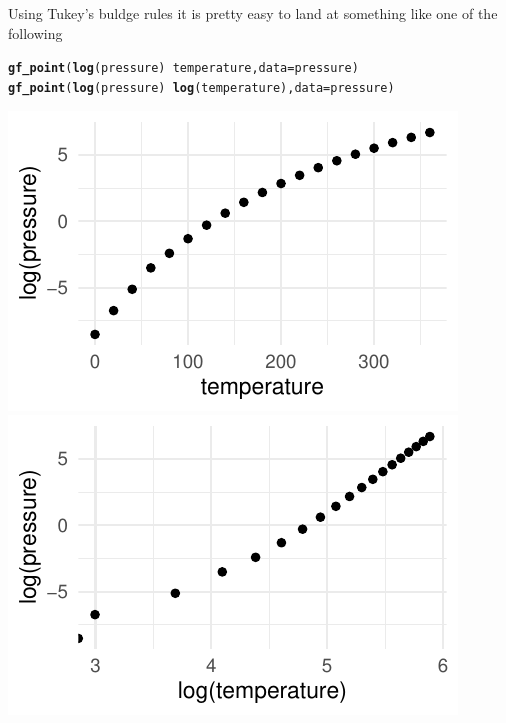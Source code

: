 \documentclass[twoside]{book}\usepackage[]{graphicx}\usepackage[]{xcolor}
\makeatletter
\def\maxwidth{ %
  \ifdim\Gin@nat@width>\linewidth
    \linewidth
  \else
    \Gin@nat@width
  \fi
}
\newcommand{\hlopt}[1]{\textcolor[rgb]{0,0,0}{#1}}%
\newcommand{\hlstd}[1]{\textcolor[rgb]{0.345,0.345,0.345}{#1}}%
\newcommand{\hlkwc}[1]{\textcolor[rgb]{0.333,0.667,0.333}{#1}}%
\newcommand{\hlkwd}[1]{\textcolor[rgb]{0.737,0.353,0.396}{\textbf{#1}}}%
\newenvironment{kframe}{%
 \def\at@end@of@kframe{}%
 \ifinner\ifhmode%
  \def\at@end@of@kframe{\end{minipage}}%
  \begin{minipage}{\columnwidth}%
 \fi\fi%
 \def\FrameCommand##1{\hskip\@totalleftmargin \hskip-\fboxsep
 \colorbox{shadecolor}{##1}\hskip-\fboxsep
     \hskip-\linewidth \hskip-\@totalleftmargin \hskip\columnwidth}%
 \MakeFramed {\advance\hsize-\width
   \@totalleftmargin\z@ \linewidth\hsize
   \@setminipage}}%
 {\par\unskip\endMakeFramed%
 \at@end@of@kframe}
\newenvironment{knitrout}{}{} %
\makeatother
\begin{document}
\begin{solution}
Using Tukey's buldge rules it is pretty easy to land at something like one of the following

\begin{knitrout}
\color{fgcolor}\begin{kframe}
\begin{alltt}
\hlkwd{gf_point}\hlstd{(}\hlkwd{log}\hlstd{(pressure)} \hlopt{~} \hlstd{temperature,} \hlkwc{data} \hlstd{= pressure)}
\hlkwd{gf_point}\hlstd{(}\hlkwd{log}\hlstd{(pressure)} \hlopt{~} \hlkwd{log}\hlstd{(temperature),} \hlkwc{data} \hlstd{= pressure)}
\end{alltt}
\end{kframe}

{\centering \includegraphics[width=\maxwidth]{figures/fig-unnamed-chunk-260-1} 
\includegraphics[width=\maxwidth]{figures/fig-unnamed-chunk-260-2} 

}




\end{knitrout}
\end{solution}
\end{document}
